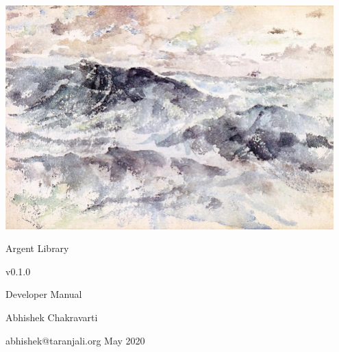 \documentclass[a4paper,twoside,12pt,english]{book}
\begin{document}
\begin{titlepage}
\centering
\includegraphics[width=0.95\textwidth]{the-great-sea.jpg}\par \vspace{1em}
\Huge Argent Library \par \vspace{0.5em} \large v0.1.0 \par \vspace{0.5em} 
\LARGE Developer Manual \par \vspace{5em} Abhishek Chakravarti \par
\vspace{0.5em} \small abhishek@taranjali.org \vfill \large May 2020
\end{titlepage}

\tableofcontents
\listoftables
\listoffigures
\listofalgorithms
\lstlistoflistings






\begin{appendices}
  
\end{appendices}

\clearpage
\printindex
\end{document}
